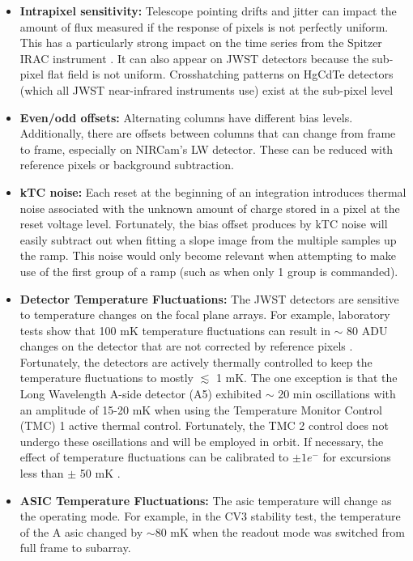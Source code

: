 \documentclass{aastex62}
\begin{document}
\begin{itemize}[noitemsep]
	\item \textbf{Intrapixel sensitivity:} Telescope pointing drifts and jitter can impact the amount of flux measured if the response of pixels is not perfectly uniform.
	This has a particularly strong impact on the time series from the Spitzer IRAC instrument \citep{ingalls2016spitzerRepeatability}.
	It can also appear on JWST detectors because the sub-pixel flat field is not uniform.
	Crosshatching patterns on HgCdTe detectors (which all JWST near-infrared instruments use) exist at the sub-pixel level  \citep{shapiro2018crosshatch,ninan2019crosshatchHPF}
	\item \textbf{Even/odd offsets:} Alternating columns have different bias levels. Additionally, there are offsets between columns that can change from frame to frame, especially on NIRCam's LW detector.
	These can be reduced with reference pixels or background subtraction.
	\item \textbf{kTC noise:} Each reset at the beginning of an integration introduces thermal noise associated with the unknown amount of charge stored in a pixel at the reset voltage level.
	Fortunately, the bias offset produces by kTC noise will easily subtract out when fitting a slope image from the multiple samples up the ramp.
	This noise would  only become relevant when attempting to make use of the first group of a ramp (such as when only 1 group is commanded).
	\item \textbf{Detector Temperature Fluctuations:} The JWST detectors are sensitive to temperature changes on the focal plane arrays. For example, laboratory tests show that 100 mK temperature fluctuations can result in $\sim$ 80 ADU changes on the detector that are not corrected by reference pixels \citep{hall2005jwstArrays}. Fortunately, the detectors are actively thermally controlled to keep the temperature fluctuations to mostly $\lesssim$ 1 mK.
The one exception is that the Long Wavelength A-side detector (A5) exhibited $\sim$ 20 min oscillations with an amplitude of 15-20 mK when using the Temperature Monitor Control (TMC) 1 active thermal control.
Fortunately, the TMC 2 control does not undergo these oscillations and will be employed in orbit.
If necessary, the effect of temperature fluctuations can be calibrated to $\pm 1 e^-$ for excursions less than $\pm$ 50 mK \citep{hall2005jwstArrays}.
	\item \textbf{ASIC Temperature Fluctuations:} The asic temperature will change as the operating mode. For example, in the CV3 stability test, the temperature of the A asic changed by $\sim$80 mK when the readout mode was switched from full frame to subarray.

\end{itemize}
\end{document}

